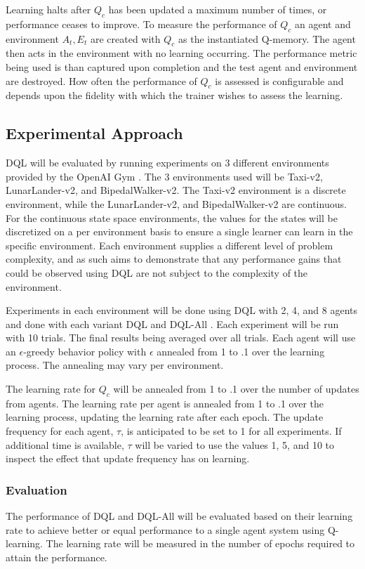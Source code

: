 \documentclass[jair,twoside,11pt,theapa]{article}
\begin{document}
Learning halts after $Q_c$ has been updated a maximum number of times, or performance ceases to improve. To measure the performance of $Q_c$ an agent 
and environment $A_t, E_t$ are created with $Q_c$ as the instantiated Q-memory. The agent then acts in the environment with no learning occurring. 
The performance metric being used is than captured upon completion and the test agent and environment are destroyed. How often the performance of $Q_c$ 
is assessed is configurable and depends upon the fidelity with which the trainer wishes to assess the learning. 


\subsection{Experimental Approach}
\label{experiments}
DQL will be evaluated by running experiments on 3 different environments provided by the OpenAI Gym \cite{gym}.
The 3 environments used will be Taxi-v2, LunarLander-v2, and BipedalWalker-v2. The Taxi-v2 environment is a discrete 
environment, while the LunarLander-v2, and BipedalWalker-v2 are continuous. For the continuous state space environments, 
the values for the states will be discretized on a per environment basis to ensure a single learner can learn in the specific environment. 
Each environment supplies a different level of problem complexity, and as such aims to demonstrate that any performance gains that could
be observed using DQL are not subject to the complexity of the environment.

Experiments in each environment will be done using DQL with 2, 4, and 8 agents and done with each variant DQL and DQL-All . Each experiment will be run with 10 trials. The final results
being averaged over all trials. Each agent will use an $\epsilon$-greedy behavior policy with $\epsilon$ annealed from 1 to .1 over the learning process. The annealing may vary per environment. 

The learning rate for $Q_c$ will be annealed from 1 to .1 over the number of updates from agents. The learning rate per agent is annealed from 1 to .1 over the learning process, updating the learning rate after each epoch. The update frequency for each agent, $\tau$, is anticipated to be set to 1 for all experiments. If additional time is available, $\tau$ will be varied 
to use the values 1, 5, and 10 to inspect the effect that update frequency has on learning. 

\subsubsection{Evaluation}
The performance of DQL and DQL-All will be evaluated based on their learning rate to achieve better or equal performance to a single agent system using Q-learning. 
The learning rate will be measured in the number of epochs required to attain the performance. 
\end{document}
